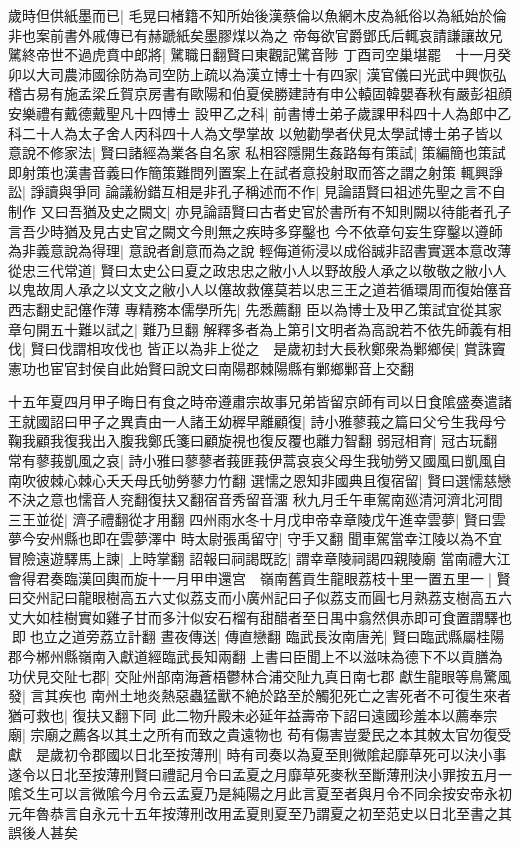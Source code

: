 歲時但供紙墨而已|{
	毛晃曰楮籍不知所始後漢蔡倫以魚網木皮為紙俗以為紙始於倫非也案前書外戚傳已有赫蹏紙矣墨膠煤以為之}
帝每欲官爵鄧氏后輒哀請謙讓故兄騭終帝世不過虎賁中郎將|{
	騭職日翻賢曰東觀記騭音陟}
丁酉司空巢堪罷　十一月癸卯以大司農沛國徐防為司空防上疏以為漢立博士十有四家|{
	漢官儀曰光武中興恢弘稽古易有施孟梁丘賀京房書有歐陽和伯夏侯勝建詩有申公轅固韓嬰春秋有嚴彭祖顔安樂禮有戴德戴聖凡十四博士}
設甲乙之科|{
	前書博士弟子歲課甲科四十人為郎中乙科二十人為太子舍人丙科四十人為文學掌故}
以勉勸學者伏見太學試博士弟子皆以意說不修家法|{
	賢曰諸經為業各自名家}
私相容隱開生姦路每有策試|{
	策編簡也策試即射策也漢書音義曰作簡策難問列置案上在試者意投射取而答之謂之射策}
輒興諍訟|{
	諍讀與爭同}
論議紛錯互相是非孔子稱述而不作|{
	見論語賢曰祖述先聖之言不自制作}
又曰吾猶及史之闕文|{
	亦見論語賢曰古者史官於書所有不知則闕以待能者孔子言吾少時猶及見古史官之闕文今則無之疾時多穿鑿也}
今不依章句妄生穿鑿以遵師為非義意說為得理|{
	意說者創意而為之說}
輕侮道術浸以成俗誠非詔書實選本意改薄從忠三代常道|{
	賢曰太史公曰夏之政忠忠之敝小人以野故殷人承之以敬敬之敝小人以鬼故周人承之以文文之敝小人以僿故救僿莫若以忠三王之道若循環周而復始僿音西志翻史記僿作薄}
專精務本儒學所先|{
	先悉薦翻}
臣以為博士及甲乙策試宜從其家章句開五十難以試之|{
	難乃旦翻}
解釋多者為上第引文明者為高說若不依先師義有相伐|{
	賢曰伐謂相攻伐也}
皆正以為非上從之　是歲初封大長秋鄭衆為鄛鄉侯|{
	賞誅竇憲功也宦官封侯自此始賢曰說文曰南陽郡棘陽縣有鄛鄉鄛音上交翻}


十五年夏四月甲子晦日有食之時帝遵肅宗故事兄弟皆留京師有司以日食隂盛奏遣諸王就國詔曰甲子之異責由一人諸王幼稺早離顧復|{
	詩小雅蓼莪之篇曰父兮生我母兮鞠我顧我復我出入腹我鄭氏箋曰顧旋視也復反覆也離力智翻}
弱冠相育|{
	冠古玩翻}
常有蓼莪凱風之哀|{
	詩小雅曰蓼蓼者莪匪莪伊蒿哀哀父母生我劬勞又國風曰凱風自南吹彼棘心棘心夭夭母氏劬勞蓼力竹翻}
選懦之恩知非國典且復宿留|{
	賢曰選懦慈戀不決之意也懦音人兖翻復扶又翻宿音秀留音澑}
秋九月壬午車駕南廵清河濟北河間三王並從|{
	濟子禮翻從才用翻}
四州雨水冬十月戊申帝幸章陵戊午進幸雲夢|{
	賢曰雲夢今安州縣也即在雲夢澤中}
時太尉張禹留守|{
	守手又翻}
聞車駕當幸江陵以為不宜冒險遠遊驛馬上諫|{
	上時掌翻}
詔報曰祠謁既訖|{
	謂幸章陵祠謁四親陵廟}
當南禮大江會得君奏臨漢回輿而旋十一月甲申還宫　嶺南舊貢生龍眼荔枝十里一置五里一|{
	賢曰交州記曰龍眼樹高五六丈似荔支而小廣州記曰子似荔支而圓七月熟荔支樹高五六丈大如桂樹實如雞子甘而多汁似安石榴有甜醋者至日禺中翕然俱赤即可食置謂驛也即也立之道旁荔立計翻}
晝夜傳送|{
	傳直戀翻}
臨武長汝南唐羌|{
	賢曰臨武縣屬桂陽郡今郴州縣嶺南入獻道經臨武長知兩翻}
上書曰臣聞上不以滋味為德下不以貢膳為功伏見交阯七郡|{
	交阯州部南海蒼梧鬱林合浦交阯九真日南七郡}
獻生龍眼等鳥驚風發|{
	言其疾也}
南州土地炎熱惡蟲猛獸不絶於路至於觸犯死亡之害死者不可復生來者猶可救也|{
	復扶又翻下同}
此二物升殿未必延年益壽帝下詔曰遠國珍羞本以薦奉宗廟|{
	宗廟之薦各以其土之所有而致之貴遠物也}
苟有傷害豈愛民之本其敇太官勿復受獻　是歲初令郡國以日北至按薄刑|{
	時有司奏以為夏至則微隂起靡草死可以決小事遂令以日北至按薄刑賢曰禮記月令曰孟夏之月靡草死麥秋至斷薄刑決小罪按五月一隂爻生可以言微隂今月令云孟夏乃是純陽之月此言夏至者與月令不同余按安帝永初元年魯恭言自永元十五年按薄刑改用孟夏則夏至乃謂夏之初至范史以日北至書之其誤後人甚矣}


